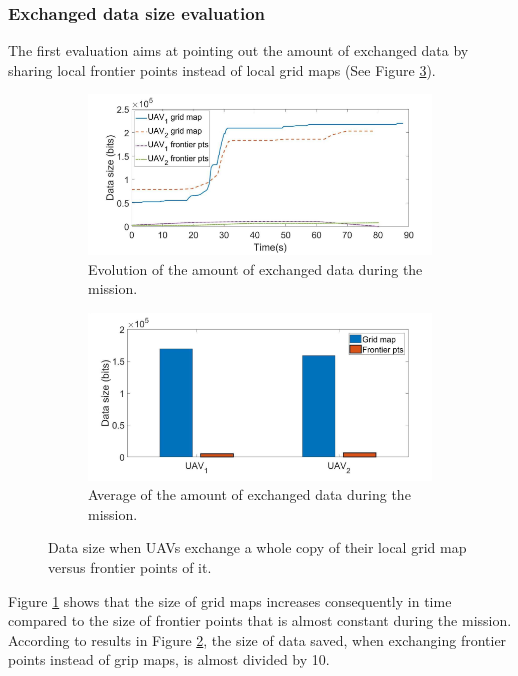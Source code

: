 \documentclass[11pt,openany]{book}
\begin{document}
\begin{algorimth}[H]
\subsubsection{Exchanged data size evaluation}
The ﬁrst evaluation aims at pointing out the amount of exchanged data by sharing local frontier points instead of local grid maps (See Figure \ref{fig:4.9}).
\begin{figure}[H]
    \centering
    \begin{subfigure}[H]{0.8\linewidth}
        \includegraphics[width=\linewidth]{assets/4_9_a.png}
        \caption{{Evolution of the amount of exchanged data during the mission.}}
        \label{fig:4.9a}
    \end{subfigure}
    \begin{subfigure}[H]{0.8\linewidth}
        \includegraphics[width=\linewidth]{assets/4_9_b.png}
        \caption{{Average of the amount of exchanged data during the mission.}}
        \label{fig:4.9b}
    \end{subfigure}
    \caption{{Data size when UAVs exchange a whole copy of their local grid map versus frontier points of it.}}
    \label{fig:4.9}
\end{figure}
Figure \ref{fig:4.9a} shows that the size of grid maps increases consequently in time compared to the size of frontier points that is almost constant during the mission. According to results in Figure \ref{fig:4.9b}, the size of data saved, when exchanging frontier points instead of grip maps, is almost divided by 10.

\end{algorimth}
\end{document}
